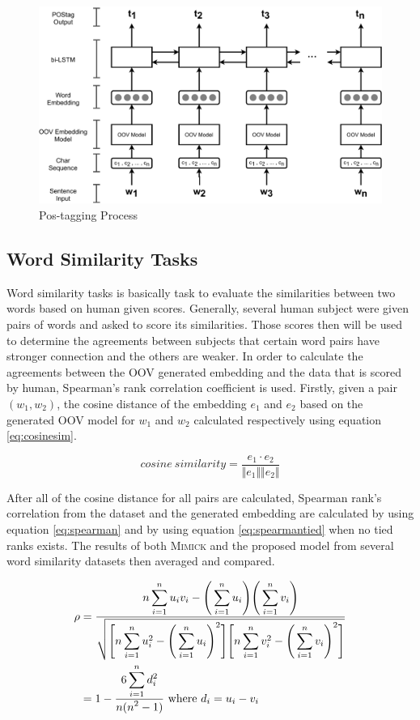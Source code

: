         \begin{figure}
            \centering
            \includegraphics[width=.8\linewidth]{images/postag.pdf}
            \caption{Pos-tagging Process}
            \label{fig:postag}
        \end{figure}
 
    \subsection{Word Similarity Tasks}
        Word similarity tasks is basically task to evaluate the
        similarities between two words based on human given scores.
        Generally, several human subject were given pairs of words and
        asked to score its similarities. Those scores then will be
        used to determine the agreements between subjects that certain
        word pairs have stronger connection and the others are weaker.
        In order to calculate the agreements between the OOV generated
        embedding and the data that is scored by human, Spearman's
        rank correlation coefficient is used. Firstly, given a pair
        $(w_1, w_2)$, the cosine distance of the embedding $e_1$ and
        $e_2$ based on the generated OOV model for $w_1$ and $w_2$
        calculated respectively using equation \ref{eq:cosinesim}.

        \begin{equation}
            \label{eq:cosinesim}
            cosine\ similarity = \frac{e_1 \cdot e_2}{\Vert e_1 \Vert \Vert e_2 \Vert}
        \end{equation}

        After all of the cosine distance for all pairs are calculated,
        Spearman rank's correlation from the dataset and the generated
        embedding are calculated by using equation \ref{eq:spearman}
        and by using equation \ref{eq:spearmantied} when no tied ranks
        exists. The results of both \textsc{Mimick} and the proposed
        model from several word similarity datasets then averaged and
        compared.
        
        \begin{align}
            \label{eq:spearman}
            \rho    &= \frac{\displaystyle n\sum_{i=1}^n u_i v_i - \Bigg( \sum_{i=1}^n u_i \Bigg) \Bigg( \sum_{i=1}^n v_i \Bigg)}{\displaystyle \sqrt{\Bigg[ n \sum_{i=1}^n u_i^2 - \Bigg( \sum_{i=1}^n u_i \Bigg)^2 \Bigg] \Bigg[ n \sum_{i=1}^n v_i^2 - \Bigg( \sum_{i=1}^n v_i \Bigg)^2 \Bigg] }}\\
            \label{eq:spearmantied}            
                    &= 1 - \frac{\displaystyle 6 \sum_{i=1}^n d_i^2}{\displaystyle n(n^2 - 1)}\ \text{where}\ d_i = u_i - v_i
        \end{align}
